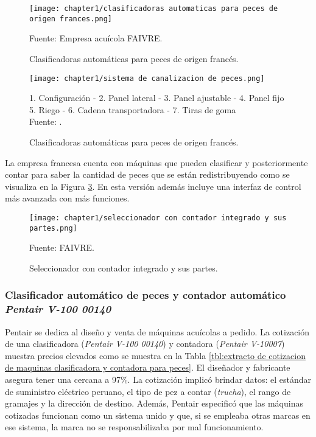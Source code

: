 \begin{figure}[H]
	\centering
	\texttt{[image: chapter1/clasificadoras automaticas para peces de origen frances.png]}
	\caption{Clasificadoras automáticas para peces de origen francés.}
	Fuente: Empresa acuícola FAIVRE.
	\label{fig:clasificadoras automaticas para peces de origen frances}
\end{figure}

\begin{figure}[H]
	\centering
	\texttt{[image: chapter1/sistema de canalizacion de peces.png]}
	\caption{Clasificadoras automáticas para peces de origen francés.}
	1. Configuración - 2. Panel lateral - 3. Panel ajustable - 4. Panel fijo \\
	5. Riego - 6. Cadena transportadora - 7. Tiras de goma\\
	Fuente: \cite{FAIVRE2018}.
	\label{fig:sistema de canalizacion de peces}
\end{figure}

La empresa francesa cuenta con máquinas que pueden clasificar y posteriormente contar para saber la cantidad de peces que se están redistribuyendo como se visualiza en la Figura \ref{fig:seleccionador con contador integrado y sus partes}. En esta versión además incluye una interfaz de control más avanzada con más funciones.

\begin{figure}[H]
	\centering
	\texttt{[image: chapter1/seleccionador con contador integrado y sus partes.png]}
	\caption{Seleccionador con contador integrado y sus partes.}
	Fuente: FAIVRE.
	\label{fig:seleccionador con contador integrado y sus partes}
\end{figure}

\subsubsection{Clasificador automático de peces y contador automático \textit{Pentair V-100 00140}}

Pentair se dedica al diseño y venta de máquinas acuícolas a pedido. La cotización de una clasificadora (\textit{Pentair V-100 00140}) y contadora (\textit{Pentair V-10007}) muestra precios elevados como se muestra en la Tabla \ref{tbl:extracto de cotizacion de maquinas clasificadora y contadora para peces}. El diseñador y fabricante asegura tener una cercana a 97\%. La cotización implicó brindar datos: el estándar de suministro eléctrico peruano, el tipo de pez a contar (\textit{trucha}), el rango de gramajes y la dirección de destino. Además, Pentair especificó que las máquinas cotizadas funcionan como un sistema unido y que, si se empleaba otras marcas en ese sistema, la marca no se responsabilizaba por mal funcionamiento.

